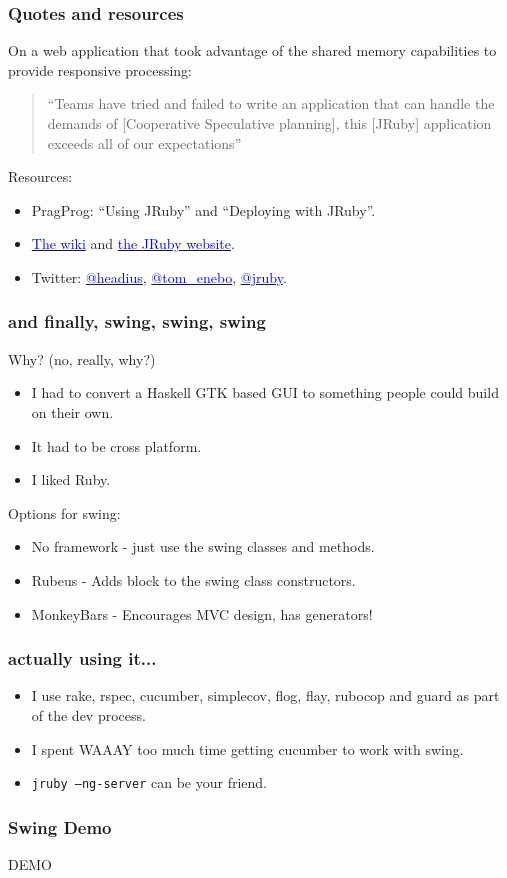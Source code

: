 \begin{frame}\frametitle{Quotes and resources}
  On a web application that took advantage of the shared memory capabilities to provide responsive
  processing:
  \begin{quote}
  ``Teams have tried and failed to write an application that can handle the demands of [Cooperative
    Speculative planning], this [JRuby] application exceeds all of our expectations''
  \end{quote}
  Resources:
  \begin{itemize}
    \item PragProg: ``Using JRuby'' and ``Deploying with JRuby''.
    \item \href{https://github.com/jruby/jruby/wiki}{\textcolor{blue}{The wiki}} and
      \href{http://jruby.org}{\textcolor{blue}{the JRuby website}}.
    \item Twitter: \href{https://twitter.com/headius}{\textcolor{blue}{@headius}},
      \href{https://twitter.com/tom\_enebo}{\textcolor{blue}{@tom\_enebo}},
      \href{https://twitter.com/jruby}{\textcolor{blue}{@jruby}}.
  \end{itemize}
\end{frame}
\begin{frame}\frametitle{and finally, swing, swing, swing}
  Why? (no, really, why?)
  \begin{itemize}
    \item I had to convert a Haskell GTK based GUI to something people could build on their own.
    \item It had to be cross platform.
    \item I liked Ruby.
  \end{itemize}
  Options for swing:
  \begin{itemize}
    \item No framework - just use the swing classes and methods.
    \item Rubeus - Adds block to the swing class constructors.
    \item MonkeyBars - Encourages MVC design, has generators!
  \end{itemize}
\end{frame}
\begin{frame}\frametitle{actually using it...}
  \begin{itemize}
    \item I use rake, rspec, cucumber, simplecov, flog, flay, rubocop and guard as part of the dev process.
    \item I spent WAAAY too much time getting cucumber to work with swing.
    \item \texttt{jruby --ng-server} can be your friend.
    \end{itemize}
\end{frame}
\begin{frame}\frametitle{Swing Demo}
  \begin{center}
  {\Huge DEMO}
  \end{center}
\end{frame}





